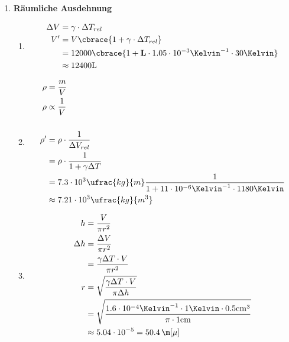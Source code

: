 \documentclass[11pt,letterpaper]{article}
\begin{document}
\begin{enumerate}
    
    \item \textbf{Räumliche Ausdehnung}
    \begin{enumerate}
        \item 
            \begin{align*}
                \Delta V &= \gamma \cdot \Delta T _{rel}\\
                V' &=V\cbrace{1+ \gamma \cdot \Delta T _{rel}}\\
                &= 12000\cbrace{1+\mathbf{L} \cdot 1.05\cdot 10^{-3} \Kelvin ^{-1} \cdot 30\Kelvin}\\
                &\approx 12400 \mathrm{L}\\
            \end{align*}
        \item 
            \begin{align*}
                \rho &= \frac{m}{V}\\
                \rho& \propto \frac{1}{V}\\
                \\
                \rho' &= \rho \cdot \frac{1}{\Delta V_{rel}}\\
                 &= \rho \cdot \frac{1}{1+\gamma \Delta T}\\
                 &= 7.3\cdot 10^{3} \ufrac{kg}{m}\frac{1}{1+11\cdot 10^{-6} \Kelvin ^{-1}\cdot 1180\Kelvin}\\
                 &\approx 7.21\cdot 10^{3} \ufrac{kg}{m^3}
            \end{align*}
        \item 
            \begin{align*}
                 h &= \frac{V}{\pi r^2}\\
                 \Delta h &= \frac{\Delta V}{\pi r^2}\\
                 &= \frac{\gamma \Delta T\cdot V}{\pi r^2}\\
                 r&= \sqrt{\frac{\gamma \Delta T\cdot V}{\pi \Delta h}}\\
                 &= \sqrt{\frac{1.6\cdot 10^{-4}\Kelvin^{-1} \cdot 1\Kelvin \cdot 0.5\mathrm{cm}^3}{\pi\cdot 1\mathrm{cm}}}\\
                &\approx 5.04\cdot10^{-5} = 50.4 \,\m[\mu]\\
            \end{align*}
    \end{enumerate}

    \newpage


\end{enumerate}
\end{document}
